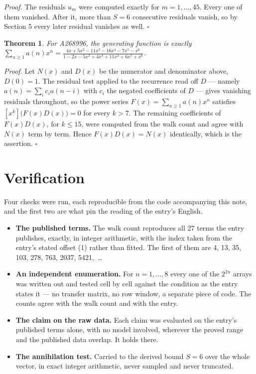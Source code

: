\documentclass[11pt]{article}
\newtheorem{theorem}{Theorem}
\theoremstyle{definition}
\begin{document}
{\itshape Proof.} The residuals $u_m$ were computed exactly for $m = 1,\dots,45$. Every one of them vanished. After it, more than $S = 6$ consecutive residuals vanish, so by Section 5 every later residual vanishes as well. $\square$

\begin{theorem} For A268996, the generating function is exactly $\sum_{n\ge 1} a(n)x^n = \frac{4x + 5x^{2} - 11x^{3} - 16x^{4} - 7x^{5} - x^{6}}{1 - 2x - 5x^{2} + 4x^{3} + 11x^{4} + 6x^{5} + x^{6}}$.\end{theorem}

{\itshape Proof.} Let $N(x)$ and $D(x)$ be the numerator and denominator above, $D(0)=1$. The residual test applied to the recurrence read off $D$ --- namely $a(n) = \sum_i c_i a(n-i)$ with $c_i$ the negated coefficients of $D$ --- gives vanishing residuals throughout, so the power series $F(x)=\sum_{n\ge 1}a(n)x^n$ satisfies $[x^k]\bigl(F(x)D(x)\bigr) = 0$ for every $k > 7$. The remaining coefficients of $F(x)D(x)$, for $k \le 15$, were computed from the walk count and agree with $N(x)$ term by term. Hence $F(x)D(x) = N(x)$ identically, which is the assertion. $\square$

\section{Verification}

Four checks were run, each reproducible from the code accompanying this note, and the first two are what pin the reading of the entry's English.

\begin{itemize}

\item {\bfseries The published terms.} The walk count reproduces all 27 terms the entry publishes, exactly, in integer arithmetic, with the index taken from the entry's stated offset (1) rather than fitted. The first of them are 4, 13, 35, 103, 278, 763, 2037, 5421,~\dots

\item {\bfseries An independent enumeration.} For $n = 1,\dots,8$ every one of the $2^{2n}$ arrays was written out and tested cell by cell against the condition as the entry states it --- no transfer matrix, no row window, a separate piece of code. The counts agree with the walk count and with the entry.

\item {\bfseries The claim on the raw data.} Each claim was evaluated on the entry's published terms alone, with no model involved, wherever the proved range and the published data overlap. It holds there.

\item {\bfseries The annihilation test.} Carried to the derived bound $S = 6$ over the whole vector, in exact integer arithmetic, never sampled and never truncated.

\end{itemize}
\end{document}
